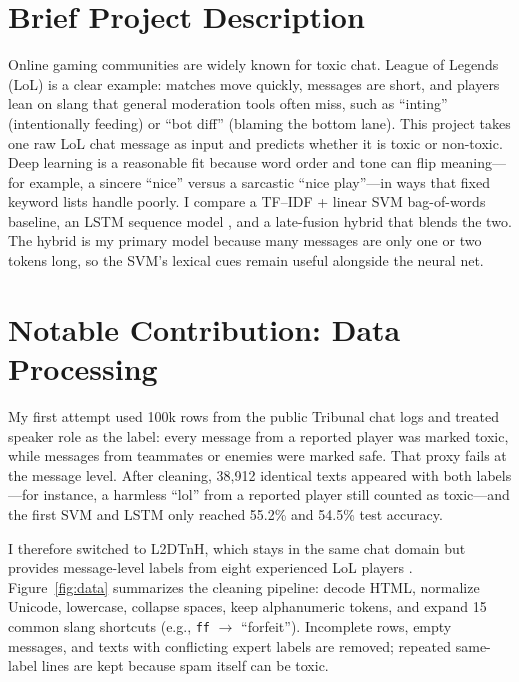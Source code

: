 \maketitle

\vspace{-0.5in}

\section*{Brief Project Description}

Online gaming communities are widely known for toxic chat. League of Legends (LoL) is a clear example: matches move quickly, messages are short, and players lean on slang that general moderation tools often miss, such as ``inting'' (intentionally feeding) or ``bot diff'' (blaming the bottom lane). This project takes one raw LoL chat message as input and predicts whether it is toxic or non-toxic. Deep learning is a reasonable fit because word order and tone can flip meaning---for example, a sincere ``nice'' versus a sarcastic ``nice play''---in ways that fixed keyword lists handle poorly. I compare a TF--IDF + linear SVM bag-of-words baseline, an LSTM sequence model \cite{hochreiter1997}, and a late-fusion hybrid that blends the two. The hybrid is my primary model because many messages are only one or two tokens long, so the SVM's lexical cues remain useful alongside the neural net.

\section*{Notable Contribution: Data Processing}

My first attempt used 100k rows from the public Tribunal chat logs \cite{kaggle_tribunal} and treated speaker role as the label: every message from a reported player was marked toxic, while messages from teammates or enemies were marked safe. That proxy fails at the message level. After cleaning, 38,912 identical texts appeared with both labels---for instance, a harmless ``lol'' from a reported player still counted as toxic---and the first SVM and LSTM only reached 55.2\% and 54.5\% test accuracy.

I therefore switched to L2DTnH, which stays in the same chat domain but provides message-level labels from eight experienced LoL players \cite{ave2026}. Figure~\ref{fig:data} summarizes the cleaning pipeline: decode HTML, normalize Unicode, lowercase, collapse spaces, keep alphanumeric tokens, and expand 15 common slang shortcuts (e.g., \texttt{ff} $\rightarrow$ ``forfeit''). Incomplete rows, empty messages, and texts with conflicting expert labels are removed; repeated same-label lines are kept because spam itself can be toxic.

